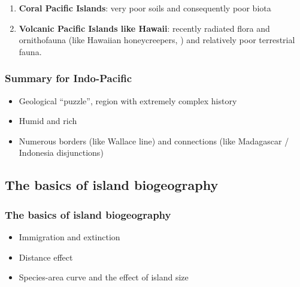 \documentclass{beamer}
\newcommand{\GI}[1]{\href{http://www.google.com/search?q=#1&tbm=isch}{\dashuline{#1}}}
\begin{document}
\begin{frame}
\begin{enumerate}
\item \textbf{Coral Pacific Islands}: very poor soils and consequently poor biota

\item \textbf{Volcanic Pacific Islands like Hawaii}: recently radiated flora and ornithofauna (like Hawaiian honeycreepers, \GI{Drepanididae}) and relatively poor terrestrial fauna.

\end{enumerate}

\end{frame}


\begin{frame}
\frametitle{Summary for Indo-Pacific}

\begin{itemize}

\item Geological ``puzzle'', region with extremely complex history

\item Humid and rich

\item Numerous borders (like Wallace line) and connections (like Madagascar / Indonesia disjunctions)

\end{itemize}

\end{frame}


\subsection{The basics of island biogeography}


\begin{frame}
\frametitle{The basics of island biogeography}

\begin{itemize}

\item Immigration and extinction

\item Distance effect

\item Species-area curve and the effect of island size

\end{itemize}

\end{frame}
\end{document}
